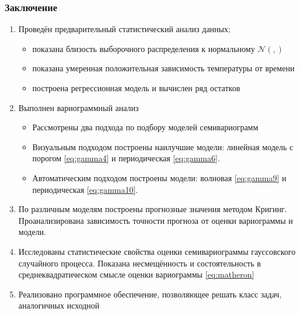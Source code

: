 \documentclass[10pt,pdf,aspectratio=169,hyperref={unicode}]{beamer}
\newcommand{\inp}[1]{}
\newcommand{\descriptive}[2]{\inp{#1/descriptive/#2}}
\newcommand{\normaldistr}{$\mathcal{N}(\descriptive{original}{mean}, \descriptive{original}{variance})$}
\begin{document}
\begin{frame}
  \frametitle{Заключение}
  \begin{enumerate}
    \item Проведён предварительный статистический анализ данных;
      \begin{itemize}
        \item показана близость выборочного распределения к нормальному \normaldistr
        \item показана умеренная положительная зависимость температуры от времени
        \item построена регрессионная модель и вычислен ряд остатков
      \end{itemize}
    \item Выполнен вариограммный анализ
      \begin{itemize}
        \item Рассмотрены два подхода по подбору моделей семивариограмм
        \item Визуальным подходом построены наилучшие модели: линейная модель с порогом \eqref{eq:gamma4} и периодическая \eqref{eq:gamma6}.
        \item Автоматическим подходом построены модели: волновая \eqref{eq:gamma9} и периодическая \eqref{eq:gamma10}.
      \end{itemize}
    \item По различным моделям построены прогнозные значения методом Кригинг. Проанализирована зависимость точности прогноза от оценки вариограммы и модели.
    \item Исследованы статистические свойства оценки семивариограммы гауссовского случайного процесса. Показана несмещённость и состоятельность в среднеквадратическом смысле оценки вариограммы \eqref{eq:matheron}
    \item Реализовано программное обеспечение, позволяющее решать класс задач, аналогичных исходной
  \end{enumerate}
\end{frame}
\end{document}
